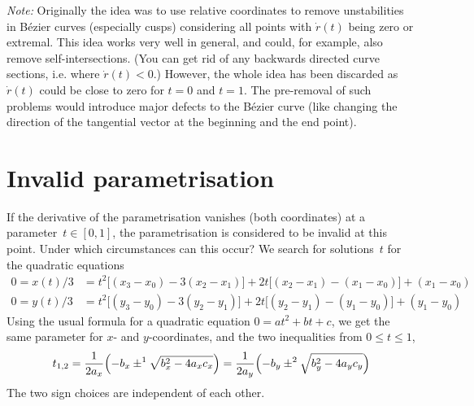 \documentclass{article}
\begin{document}
\emph{Note:} Originally the idea was to use relative coordinates to
remove unstabilities in B\'ezier curves (especially cusps) considering
all points with $\dot r(t)$ being zero or extremal. This idea works
very well in general, and could, for example, also remove
self-intersections. (You can get rid of any backwards directed curve
sections, i.e. where $\dot r(t)<0$.) However, the whole idea has been
discarded as $\dot r(t)$ could be close to zero for $t=0$ and $t=1$.
The pre-removal of such problems would introduce major defects to the
B\'ezier curve (like changing the direction of the tangential vector
at the beginning and the end point).

\section{Invalid parametrisation}

If the derivative of the parametrisation vanishes (both coordinates) at a
parameter~$t\in[0,1]$, the parametrisation is considered to be invalid at this
point. Under which circumstances can this occur? We search for solutions~$t$ for
the quadratic equations
%
\begin{equation}
  \label{zeroderiv}
  \begin{aligned}
    0 = x(t)/3 &= t^2\bigl[(x_3-x_0) - 3(x_2-x_1)\bigr] + 2t\bigl[(x_2-x_1)-(x_1-x_0)\bigr] + (x_1-x_0) \\
    0 = y(t)/3 &= t^2\bigl[(y_3-y_0) - 3(y_2-y_1)\bigr] + 2t\bigl[(y_2-y_1)-(y_1-y_0)\bigr] + (y_1-y_0)
  \end{aligned}
\end{equation}
%
Using the usual formula for a quadratic equation $0=at^2 + bt + c$, we get the
same parameter for $x$- and $y$-coordinates, and the two inequalities from
$0\leq t\leq1$,
%
\begin{equation}
  \label{samet}
  t_{1,2} = \frac{1}{2a_x} \Bigl(-b_x \pm^1 \sqrt{b_x^2 - 4a_xc_x}\Bigr)
          = \frac{1}{2a_y} \Bigl(-b_y \pm^2 \sqrt{b_y^2 - 4a_yc_y}\Bigr)
\end{equation}
%
The two sign choices are independent of each other.
\end{document}
